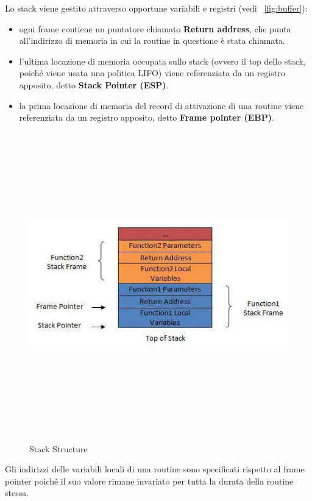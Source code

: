 Lo stack viene gestito attraverso opportune variabili e registri (vedi \figurename ~\ref{fig:buffer}):
\begin{itemize}
  \item ogni frame contiene un puntatore chiamato \textbf{Return address}, che punta all'indirizzo di memoria in cui la routine in questione è stata chiamata.
  \item l'ultima locazione di memoria occupata sullo stack (ovvero il top dello stack, poiché viene usata una politica LIFO) viene referenziata da un registro apposito, detto \textbf{Stack Pointer (ESP)}.
  \item la prima locazione di memoria del record di attivazione di una routine viene referenziata da un registro apposito, detto \textbf{Frame pointer (EBP)}.
\end{itemize}
\begin{figure}[htbp]
	\centering%
	\subfigure%
	{\includegraphics[height=13cm, width=13cm, keepaspectratio]{Immagini/sistemi_operativi/buffer.png}}
	\caption{Stack Structure \label{fig:salt}} 	
\end{figure}
Gli indirizzi delle variabili locali di una routine sono specificati rispetto al frame pointer poiché il suo valore rimane invariato per tutta la durata della routine stessa. \newline \newline
